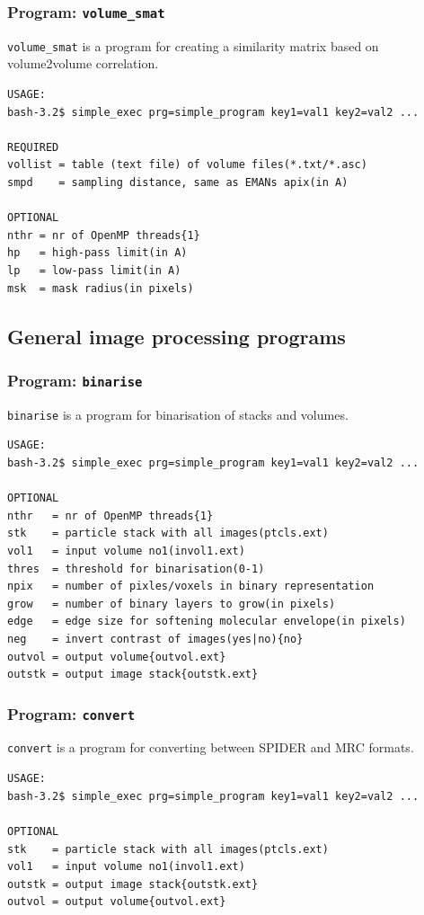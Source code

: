\documentclass[a4paper,11pt]{article}
\newcommand{\prgname}[1]{\textcolor{NavyBlue}{\texttt{#1}}}
\begin{document}
\subsubsection{Program: \prgname{volume\_smat}}
\label{volume_smat}
\prgname{volume\_smat} is a program for creating a similarity matrix based on volume2volume correlation.

\begin{verbatim}
USAGE:
bash-3.2$ simple_exec prg=simple_program key1=val1 key2=val2 ...

REQUIRED
vollist = table (text file) of volume files(*.txt/*.asc)
smpd    = sampling distance, same as EMANs apix(in A)

OPTIONAL
nthr = nr of OpenMP threads{1}
hp   = high-pass limit(in A)
lp   = low-pass limit(in A)
msk  = mask radius(in pixels)
\end{verbatim}

\subsection{General image processing programs}

\subsubsection{Program: \prgname{binarise}}
\label{binarise}
\prgname{binarise} is a program for binarisation of stacks and volumes.

\begin{verbatim}
USAGE:
bash-3.2$ simple_exec prg=simple_program key1=val1 key2=val2 ...

OPTIONAL
nthr   = nr of OpenMP threads{1}
stk    = particle stack with all images(ptcls.ext)
vol1   = input volume no1(invol1.ext)
thres  = threshold for binarisation(0-1)
npix   = number of pixles/voxels in binary representation
grow   = number of binary layers to grow(in pixels)
edge   = edge size for softening molecular envelope(in pixels)
neg    = invert contrast of images(yes|no){no}
outvol = output volume{outvol.ext}
outstk = output image stack{outstk.ext}
\end{verbatim}

\subsubsection{Program: \prgname{convert}}
\label{convert}
\prgname{convert} is a program for converting between SPIDER and MRC formats.

\begin{verbatim}
USAGE:
bash-3.2$ simple_exec prg=simple_program key1=val1 key2=val2 ...

OPTIONAL
stk    = particle stack with all images(ptcls.ext)
vol1   = input volume no1(invol1.ext)
outstk = output image stack{outstk.ext}
outvol = output volume{outvol.ext}
\end{verbatim}
\end{document}
